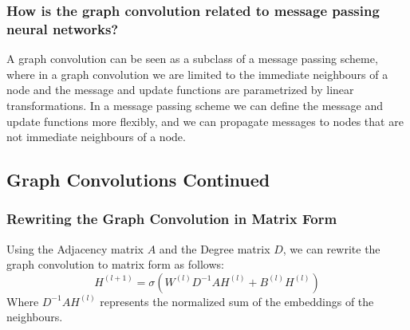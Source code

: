 \documentclass[a4paper]{article}
\begin{document}
\subsubsection{How is the graph convolution related to message passing neural networks?}
A graph convolution can be seen as a subclass of a message passing scheme, where in a graph convolution we are
limited to the immediate neighbours of a node and the message and update functions are parametrized by linear
transformations. In a message passing scheme we can define the message and update functions more flexibly, and we can
propagate messages to nodes that are not immediate neighbours of a node.
\bigskip

\subsection{Graph Convolutions Continued}

\subsubsection{Rewriting the Graph Convolution in Matrix Form}
Using the Adjacency matrix $A$ and the Degree matrix $D$, we can rewrite the graph convolution to matrix form as
follows:
$$H^{(l+1)} = \sigma \left( W^{(l)} D^{-1} A H^{(l)} + B^{(l)} H^{(l)} \right)$$
Where $D^{-1}AH^{(l)}$ represents the normalized sum of the embeddings of the neighbours. 
\end{document}
